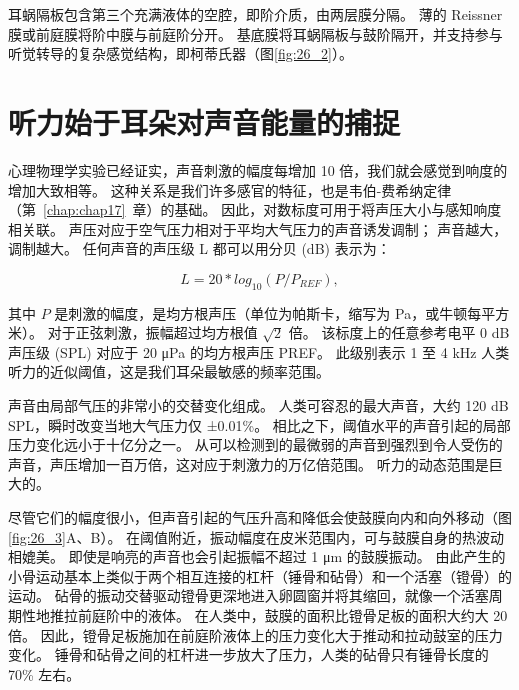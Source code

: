 耳蜗隔板包含第三个充满液体的空腔，即阶介质，由两层膜分隔。 
薄的 Reissner 膜或前庭膜将阶中膜与前庭阶分开。 
基底膜将耳蜗隔板与鼓阶隔开，并支持参与听觉转导的复杂感觉结构，即柯蒂氏器（图\ref{fig:26_2}）。


\section{听力始于耳朵对声音能量的捕捉}
心理物理学实验已经证实，声音刺激的幅度每增加 10 倍，我们就会感觉到响度的增加大致相等。 
这种关系是我们许多感官的特征，也是韦伯-费希纳定律（第~\ref{chap:chap17}~章）的基础。 
因此，对数标度可用于将声压大小与感知响度相关联。 
声压对应于空气压力相对于平均大气压力的声音诱发调制； 声音越大，调制越大。 
任何声音的声压级 L 都可以用分贝 (dB) 表示为：

\begin{equation}\label{sound_pressure}
	L = 20 * log_10 (P/P_{REF}),
\end{equation}

其中 $P$ 是刺激的幅度，是均方根声压（单位为帕斯卡，缩写为 Pa，或牛顿每平方米）。 
对于正弦刺激，振幅超过均方根值 $ \sqrt{2}$ 倍。 
该标度上的任意参考电平 0 dB 声压级 (SPL) 对应于 20 μPa 的均方根声压 PREF。 
此级别表示 1 至 4 kHz 人类听力的近似阈值，这是我们耳朵最敏感的频率范围。

声音由局部气压的非常小的交替变化组成。 
人类可容忍的最大声音，大约 120 dB SPL，瞬时改变当地大气压力仅 ±0.01\%。 
相比之下，阈值水平的声音引起的局部压力变化远小于十亿分之一。 
从可以检测到的最微弱的声音到强烈到令人受伤的声音，声压增加一百万倍，这对应于刺激力的万亿倍范围。 
听力的动态范围是巨大的。


尽管它们的幅度很小，但声音引起的气压升高和降低会使鼓膜向内和向外移动（图\ref{fig:26_3}A、B）。 
在阈值附近，振动幅度在皮米范围内，可与鼓膜自身的热波动相媲美。 
即使是响亮的声音也会引起振幅不超过 1 μm 的鼓膜振动。 
由此产生的小骨运动基本上类似于两个相互连接的杠杆（锤骨和砧骨）和一个活塞（镫骨）的运动。 
砧骨的振动交替驱动镫骨更深地进入卵圆窗并将其缩回，就像一个活塞周期性地推拉前庭阶中的液体。 
在人类中，鼓膜的面积比镫骨足板的面积大约大 20 倍。 
因此，镫骨足板施加在前庭阶液体上的压力变化大于推动和拉动鼓室的压力变化。 
锤骨和砧骨之间的杠杆进一步放大了压力，人类的砧骨只有锤骨长度的 70\% 左右。

